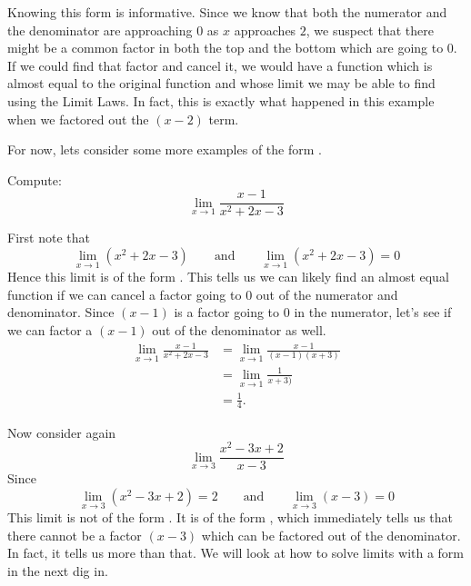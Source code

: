 \documentclass{ximera}
\begin{document}
Knowing this form is informative.  Since we know that both the
numerator and the denominator are approaching $0$ as $x$ approaches
$2$, we suspect that there might be a common factor in both the top
and the bottom which are going to $0$.  If we could find that factor
and cancel it, we would have a function which is almost equal to the
original function and whose limit we may be able to find using the
Limit Laws.  In fact, this is exactly what happened in this example
when we factored out the $(x-2)$ term.

For now, lets consider some more examples of the form \zeroOverZero.

\begin{example}
  Compute:
  \[
  \lim_{x\to1}\frac{x-1}{x^2+2x-3}
  \]
  \begin{explanation}
    First note that
    \[
    \lim_{x\to1}\left(x^2+2x-3\right) \qquad\text{and}\qquad  \lim_{x\to1}\left(x^2+2x-3\right) = 0
    \]
    Hence this limit is of the form \zeroOverZero.  This tells us we
    can likely find an almost equal function if we can cancel a factor
    going to $0$ out of the numerator and denominator.  Since $(x-1)$
    is a factor going to $0$ in the numerator, let's see if we can
    factor a $(x-1)$ out of the denominator as well.
    \begin{align*}
      \lim_{x\to1}\frac{x-1}{x^2+2x-3}&=\lim_{x\to1}\frac{x-1}{(x-1)(x+3)} \\
      &=\lim_{x\to1}\frac{1}{x+3)}\\
      &=\frac{1}{4}.
    \end{align*}
  \end{explanation}
\end{example}

Now consider again
\[
\lim_{x\to 3}\frac{x^2-3x+2}{x-3} 
\]
Since
\[
\lim_{x\to3}\left(x^2-3x+2\right) = 2 \qquad\text{and}\qquad  \lim_{x\to3}\left(x-3\right) = 0
\]
This limit is not of the form \zeroOverZero. It is of the form
\numOverZero, which immediately tells us that there cannot be a factor
$(x-3)$ which can be factored out of the denominator.  In fact, it
tells us more than that.  We will look at how to solve limits with a
form \numOverZero in the next dig in.


\end{document}
